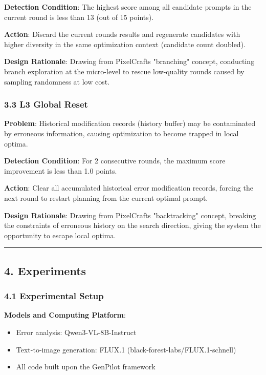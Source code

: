 \documentclass[
]{article}
\begin{document}
\textbf{Detection Condition}: The highest score among all candidate
prompts in the current round is less than 13 (out of 15 points).

\textbf{Action}: Discard the current round\textquotesingle s results and
regenerate candidates with higher diversity in the same optimization
context (candidate count doubled).

\textbf{Design Rationale}: Drawing from PixelCraft\textquotesingle s
"branching" concept, conducting branch exploration at the micro-level to
rescue low-quality rounds caused by sampling randomness at low cost.

\subsubsection{3.3 L3 Global Reset}\label{33-l3-global-reset}

\textbf{Problem}: Historical modification records (history buffer) may
be contaminated by erroneous information, causing optimization to become
trapped in local optima.

\textbf{Detection Condition}: For 2 consecutive rounds, the maximum
score improvement is less than 1.0 points.

\textbf{Action}: Clear all accumulated historical error modification
records, forcing the next round to restart planning from the current
optimal prompt.

\textbf{Design Rationale}: Drawing from PixelCraft\textquotesingle s
"backtracking" concept, breaking the constraints of erroneous history on
the search direction, giving the system the opportunity to escape local
optima.

\begin{center}\rule{0.5\linewidth}{0.5pt}\end{center}

\subsection{4. Experiments}\label{4-experiments}

\subsubsection{4.1 Experimental Setup}\label{41-experimental-setup}

\textbf{Models and Computing Platform}:

\begin{itemize}
\item
  Error analysis: Qwen3-VL-8B-Instruct
\item
  Text-to-image generation: FLUX.1 (black-forest-labs/FLUX.1-schnell)
\item
  All code built upon the GenPilot framework
\end{itemize}
\end{document}
